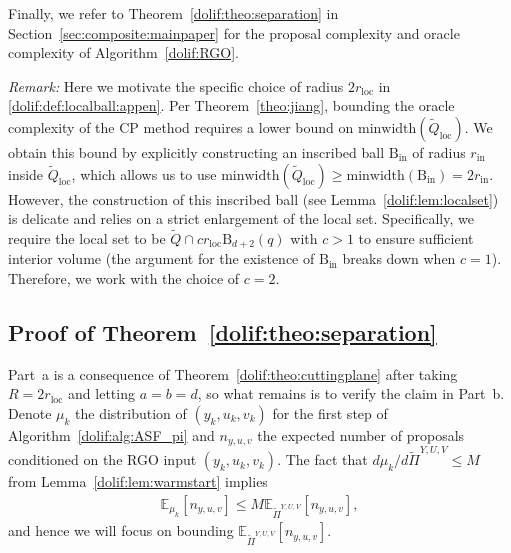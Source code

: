 \documentclass[11pt,letterpaper]{article}
\newcommand{\ball}{\mathrm{B}}
\newcommand{\local}{\mathrm{loc}}
\newcommand{\Q}{\widetilde{Q}}
\newcommand{\E}{\mathbb{E}}
\newcommand{\rin}{r_{\mathrm{in}}}
\begin{document}
Finally, we refer to Theorem~\ref{dolif:theo:separation} in Section~\ref{sec:composite:mainpaper} for the proposal complexity and oracle complexity of Algorithm~\ref{dolif:RGO}. 

\textit{Remark:}
    Here we motivate the specific choice of radius $2r_{\local}$ in \eqref{dolif:def:localball:appen}. 
Per Theorem~\ref{theo:jiang}, bounding the oracle complexity of the CP method requires a lower bound on $\mbox{minwidth}(\Q_{\local})$. We obtain this bound by explicitly constructing an inscribed ball $\ball_{\mathrm{in}}$ of radius $\rin$ inside $\Q_{\local}$, which allows us to use $\mbox{minwidth}(\Q_{\local})\ge \mbox{minwidth}(\ball_{\mathrm{in}})=2\rin$. 
However, the construction of this inscribed ball (see Lemma~\ref{dolif:lem:localset}) is delicate and relies on a strict enlargement of the local set. Specifically, we require the local set to be $\Q\cap c r_{\local}\ball_{d+2}(q)$ with $c>1$ to ensure sufficient interior volume (the argument for the existence of $\ball_{\mathrm{in}}$ breaks down when $c=1$). Therefore, we work with the choice of $c=2$.





\subsection{Proof of Theorem~\ref{dolif:theo:separation}}
\label{dolif:appen:proofsepatheorem}

 

Part~a is a consequence of Theorem~\ref{dolif:theo:cuttingplane} after taking $R=2r_{\local}$ and letting $a=b=d$, so what remains is to verify the claim in Part~b.  Denote $\mu_k$ the distribution of $(y_k,u_k,v_k)$ for the first step of Algorithm~\ref{dolif:alg:ASF_pi} and $n_{y,u,v}$ the expected number of proposals conditioned on the RGO input $(y_k,u_k,v_k)$. The fact that $d\mu_k/d\widetilde{\Pi}^{Y,U,V}\leq M$ from Lemma~\ref{dolif:lem:warmstart} implies 
\begin{align}
\label{dolif:warmstartimplicationsepa}
	\E_{\mu_k}[n_{y,u,v}] \le M \E_{\widetilde{\Pi}^{Y,U,V}}[n_{y,u,v}], 
\end{align}
and hence we will focus on bounding $\E_{\widetilde{\Pi}^{Y,U,V}}[n_{y,u,v}]$.
\end{document}
